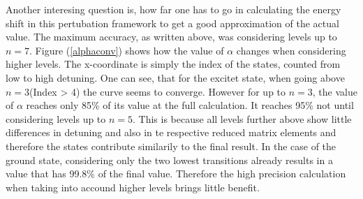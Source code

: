 Another interesing question is, how far one has to go in calculating the energy shift in this pertubation framework to get a good approximation of the actual value. The maximum accuracy, as written above, was considering levels up to $n=7$. Figure (\ref{alphaconv}) shows how the value of $\alpha$ changes when considering higher levels. The x-coordinate is simply the index of the states, counted from low to high detuning. One can see, that for the excitet state, when going above $n=3$(Index > 4) the curve seems to converge. However for up to $n=3$, the value of $\alpha$ reaches only 85\% of its value at the full calculation. It reaches 95\% not until considering levels up to $n=5$. This is because all levels further above show little differences in detuning and also in te respective reduced matrix elements and therefore the states contribute similarily to the final result. In the case of the ground state, considering only the two lowest transitions already results in a value that has 99.8\% of the final value. Therefore the high precision calculation when taking into accound higher levels brings little benefit.

